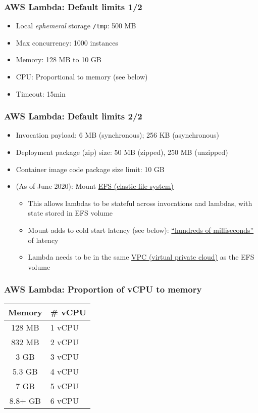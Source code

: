 \documentclass[11pt,aspectratio=169]{beamer}
\begin{document}
\begin{nrcanFrame}
  \frametitle{AWS Lambda: Default limits 1/2}
  \begin{itemize}
  \item Local \textit{ephemeral} storage \texttt{/tmp}: 500 MB 
  \item Max concurrency: 1000 instances
  \item Memory: 128 MB to 10 GB
  \item CPU: Proportional to memory (see below)
  \item Timeout: 15min
  \end{itemize}
\end{nrcanFrame}




\begin{nrcanFrame}
  \frametitle{AWS Lambda: Default limits 2/2}
  \begin{itemize}
  \item Invocation payload: 6 MB (synchronous); 256 KB (asynchronous)
  \item Deployment package (zip) size: 50 MB (zipped), 250 MB (unzipped)
  \item Container image code package size limit: 10 GB
  \item (As of June 2020): Mount \href{https://aws.amazon.com/efs/}{EFS (elastic file system)}
    \begin{itemize}
    \item This allows lambdas to be stateful across invocations and lambdas, with state stored in EFS volume
    \item Mount adds to cold start latency (see below):
      \href{https://aws.amazon.com/blogs/compute/using-amazon-efs-for-aws-lambda-in-your-serverless-applications/}{``hundreds
        of milliseconds''} of latency
    \item Lambda needs to be in the same
      \href{https://aws.amazon.com/vpc/}{VPC (virtual private cloud)} as the EFS volume
    \end{itemize}
  \end{itemize}
\end{nrcanFrame}


\begin{nrcanFrame}
  \frametitle{AWS Lambda: Proportion of vCPU to memory}
  \centering
  \begin{table}
  \begin{tabular}{|c||l|}
    \hline    \hline
    \bf Memory & \# \bf vCPU \\  \hline
    128 MB & 1 vCPU \\ \hline
  832 MB & 2 vCPU \\ \hline
  3 GB & 3 vCPU \\ \hline
  5.3 GB & 4 vCPU \\ \hline
  7 GB & 5 vCPU \\ \hline
  8.8+ GB & 6 vCPU \\
      \hline    \hline
  \end{tabular}
  \end{table}
\end{nrcanFrame}
\end{document}
